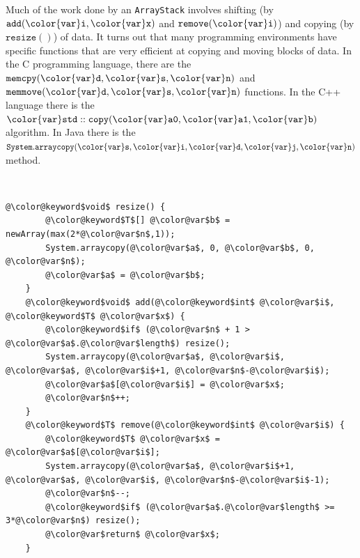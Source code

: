 \documentclass[10pt]{book}
\theoremstyle{plain}
\theoremstyle{definition}
\begin{document}
%
Much of the work done by an \texttt{ArrayStack} involves shifting (by
\ensuremath{\mathtt{add({\color{var}i},{\color{var}x})}} and \ensuremath{\mathtt{remove({\color{var}i})}}) and copying (by \ensuremath{\mathtt{resize()}}) of data.
%
It
turns out that many programming environments have specific functions
that are very efficient at copying and moving blocks of data.  In the C
programming language, there are the \ensuremath{\mathtt{memcpy({\color{var}d},{\color{var}s},{\color{var}n})}} and \ensuremath{\mathtt{memmove({\color{var}d},{\color{var}s},{\color{var}n})}}
functions. In the C++ language there is the \ensuremath{\mathtt{{\color{var}std}::copy({\color{var}a0},{\color{var}a1},{\color{var}b})}} algorithm.
In Java there is the \ensuremath{\mathtt{System.arraycopy({\color{var}s},{\color{var}i},{\color{var}d},{\color{var}j},{\color{var}n})}} method.
%
%
%



 \ \vspace{.5ex}\begin{Verbatim}[gobble=1,tabsize=2,frame=single,framerule=1.2pt,commandchars=\\@\$,label=\texttt{FastArrayStack},labelposition=topline]
	@\color@keyword$void$ resize() {
		@\color@keyword$T$[] @\color@var$b$ = newArray(max(2*@\color@var$n$,1));
		System.arraycopy(@\color@var$a$, 0, @\color@var$b$, 0, @\color@var$n$);
		@\color@var$a$ = @\color@var$b$;
	}
	@\color@keyword$void$ add(@\color@keyword$int$ @\color@var$i$, @\color@keyword$T$ @\color@var$x$) {
		@\color@keyword$if$ (@\color@var$n$ + 1 > @\color@var$a$.@\color@var$length$) resize();
		System.arraycopy(@\color@var$a$, @\color@var$i$, @\color@var$a$, @\color@var$i$+1, @\color@var$n$-@\color@var$i$); 
		@\color@var$a$[@\color@var$i$] = @\color@var$x$;
		@\color@var$n$++;
	}
	@\color@keyword$T$ remove(@\color@keyword$int$ @\color@var$i$) {
		@\color@keyword$T$ @\color@var$x$ = @\color@var$a$[@\color@var$i$];
		System.arraycopy(@\color@var$a$, @\color@var$i$+1, @\color@var$a$, @\color@var$i$, @\color@var$n$-@\color@var$i$-1);
		@\color@var$n$--; 
		@\color@keyword$if$ (@\color@var$a$.@\color@var$length$ >= 3*@\color@var$n$) resize();
		@\color@var$return$ @\color@var$x$;
	}
\end{Verbatim}
\end{document}
